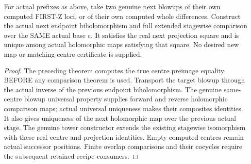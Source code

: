\begin{theorem}
\label{hir:sharp-original-curve-biholomorphic-base-next-stage-comparison}
\leanok
For actual prefixes as above, take two genuine next blowups of their
own computed FIRST-Z loci, or of their own computed whole differences.
Construct the actual next endpoint biholomorphism and full extended
stagewise comparison over the SAME actual base $e$. It satisfies the
real next projection square and is unique among actual holomorphic
maps satisfying that square. No desired new map or matching-centre
certificate is supplied.
\end{theorem}
\begin{proof}
The preceding theorem computes the true centre preimage equality
BEFORE any comparison theorem is used. Transport the target blowup
through the actual inverse of the previous endpoint biholomorphism.
The genuine same-centre blowup universal property supplies forward and
reverse holomorphic comparison maps; actual universal uniqueness makes
their composites identities. It also gives uniqueness of the next
holomorphic map over the previous actual stage. The genuine tower
constructor extends the existing stagewise isomorphism with these
real centre and projection identities. Empty computed centres remain
actual successor positions. Finite overlap comparisons and their
cocycles require the subsequent retained-recipe consumers.
\end{proof}
